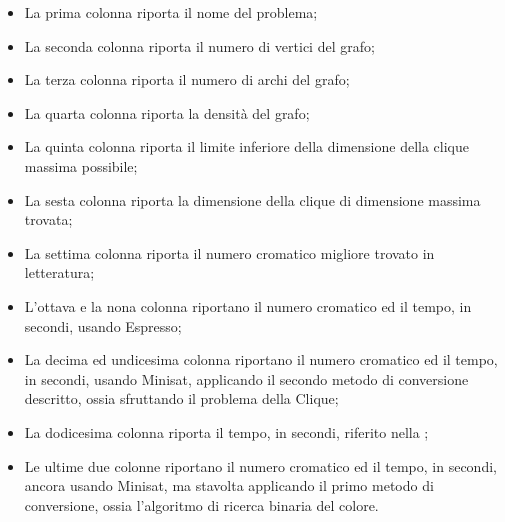 \documentclass[a4paper,11pt]{article} %
\begin{document}
\begin{itemize}
	\item La prima colonna riporta il nome del problema;
	\item La seconda colonna riporta il numero di vertici del grafo;
	\item La terza colonna riporta il numero di archi del grafo;
	\item La quarta colonna riporta la densità del grafo;
	\item La quinta colonna riporta il limite inferiore della dimensione della clique massima possibile;
	\item La sesta colonna riporta la dimensione della clique di dimensione massima trovata;
	\item La settima colonna riporta il numero cromatico migliore trovato in letteratura;
	\item L'ottava e la nona colonna riportano il numero cromatico ed il tempo, in secondi, usando Espresso;
	\item La decima ed undicesima colonna riportano il numero cromatico ed il tempo, in secondi, usando Minisat, applicando il secondo metodo di conversione descritto, ossia sfruttando il problema della Clique;
	\item La dodicesima colonna riporta il tempo, in secondi, riferito nella \cite{tesi};
	\item Le ultime due colonne riportano il numero cromatico ed il tempo, in secondi, ancora usando Minisat, ma stavolta applicando il primo metodo di conversione, ossia l'algoritmo di ricerca binaria del colore.
\end{itemize}


\end{document}
